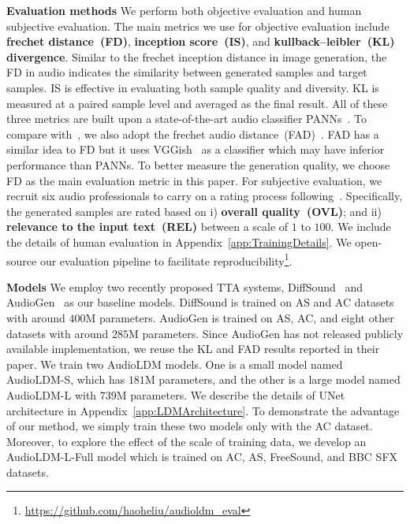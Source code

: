 \documentclass{article}
\begin{document}
\textbf{Evaluation methods} We perform both objective evaluation and human subjective evaluation. The main metrics we use for objective evaluation include \textbf{frechet distance~(FD)}, \textbf{inception score~(IS)}, and \textbf{kullback–leibler~(KL) divergence}. Similar to the frechet inception distance in image generation, the FD in audio indicates the similarity between generated samples and target samples. IS is effective in evaluating both sample quality and diversity. KL is measured at a paired sample level and averaged as the final result. All of these three metrics are built upon a state-of-the-art audio classifier PANNs~\cite{kong2020panns}. To compare with~\cite{kreuk2022audiogen}, we also adopt the frechet audio distance~(FAD)~\cite{kilgour2019frechet}. FAD has a similar idea to FD but it uses VGGish~\cite{vggish_hershey2017cnn} as a classifier which may have inferior performance than PANNs. To better measure the generation quality, we choose FD as the main evaluation metric in this paper. For subjective evaluation, we recruit six audio professionals to carry on a rating process following~\cite{kreuk2022audiogen,yang2022diffsound}. Specifically, the generated samples are rated based on i) \textbf{overall quality~(OVL)}; and ii) \textbf{relevance to the input text~(REL)} between a scale of $1$ to $100$. We include the details of human evaluation in Appendix~\ref{app:TrainingDetails}. We open-source our evaluation pipeline to facilitate reproducibility\footnote{\url{https://github.com/haoheliu/audioldm_eval}}.








\textbf{Models} We employ two recently proposed TTA systems, DiffSound~\cite{yang2022diffsound} and AudioGen~\cite{kreuk2022audiogen} as our baseline models. DiffSound is trained on AS and AC datasets with around $400$M parameters. AudioGen is trained on AS, AC, and eight other datasets with around $285$M parameters. Since AudioGen has not released publicly available implementation, we reuse the KL and FAD results reported in their paper. We train two AudioLDM models. One is a small model named AudioLDM-S, which has $181$M parameters, and the other is a large model named AudioLDM-L with $739$M parameters. We describe the details of UNet architecture in Appendix~\ref{app:LDMArchitecture}. To demonstrate the advantage of our method, we simply train these two models only with the AC dataset. Moreover, to explore the effect of the scale of training data, we develop an AudioLDM-L-Full model which is trained on AC, AS, FreeSound, and BBC SFX datasets. 
\end{document}
